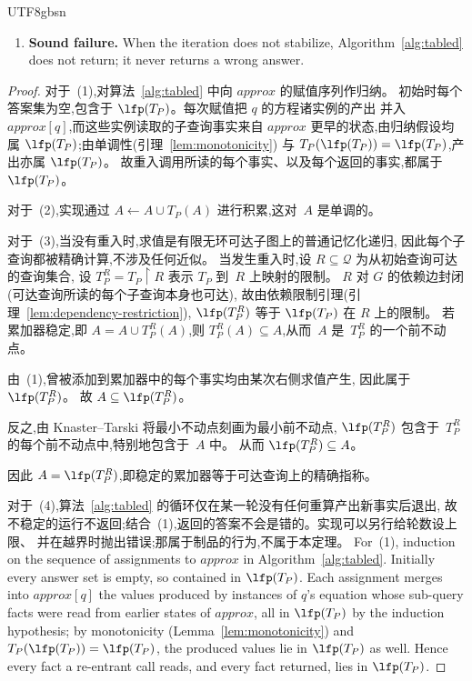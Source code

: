 \begin{CJK*}{UTF8}{gbsn}
\begin{theorem}
\begin{enumerate}
    \item \textbf{Sound failure.}
      When the iteration does not stabilize,
      Algorithm~\ref{alg:tabled} does not return; it never
      returns a wrong answer.
  \end{enumerate}
  \fi
\end{theorem}

\begin{proof}
\ifPaperChinese
  对于~(1),对算法~\ref{alg:tabled} 中向 $\mathit{approx}$ 的赋值序列作归纳。
  初始时每个答案集为空,包含于 $\lfp(T_P)$。每次赋值把 $q$ 的方程诸实例的产出
  并入 $\mathit{approx}[q]$,而这些实例读取的子查询事实来自 $\mathit{approx}$
  更早的状态,由归纳假设均属 $\lfp(T_P)$;由单调性(引理~\ref{lem:monotonicity})
  与 $T_P(\lfp(T_P)) = \lfp(T_P)$,产出亦属 $\lfp(T_P)$。
  故重入调用所读的每个事实、以及每个返回的事实,都属于 $\lfp(T_P)$。

  对于~(2),实现通过 $A \leftarrow A \cup T_P(A)$ 进行积累,这对~$A$ 是单调的。

  对于~(3),当没有重入时,求值是有限无环可达子图上的普通记忆化递归,
  因此每个子查询都被精确计算,不涉及任何近似。
  当发生重入时,设 $R \subseteq \mathcal{Q}$ 为从初始查询可达的查询集合,
  设 $T_P^R = T_P{\restriction}R$ 表示 $T_P$ 到~$R$ 上映射的限制。
  $R$ 对 $G$ 的依赖边封闭(可达查询所读的每个子查询本身也可达),
  故由依赖限制引理(引理~\ref{lem:dependency-restriction}),
  $\lfp(T_P^R)$ 等于 $\lfp(T_P)$ 在 $R$ 上的限制。
  若累加器稳定,即 $A = A \cup T_P^R(A)$,则
  $T_P^R(A) \subseteq A$,从而~$A$ 是~$T_P^R$ 的一个前不动点。

  由~(1),曾被添加到累加器中的每个事实均由某次右侧求值产生,
  因此属于 $\lfp(T_P^R)$。
  故 $A \subseteq \lfp(T_P^R)$。

  反之,由 Knaster--Tarski 将最小不动点刻画为最小前不动点,
  $\lfp(T_P^R)$ 包含于~$T_P^R$ 的每个前不动点中,特别地包含于~$A$ 中。
  从而 $\lfp(T_P^R) \subseteq A$。

  因此 $A = \lfp(T_P^R)$,即稳定的累加器等于可达查询上的精确指称。

  对于~(4),算法~\ref{alg:tabled} 的循环仅在某一轮没有任何重算产出新事实后退出,
  故不稳定的运行不返回;结合~(1),返回的答案不会是错的。实现可以另行给轮数设上限、
  并在越界时抛出错误;那属于制品的行为,不属于本定理。
\else
  For~(1), induction on the sequence of assignments to
  $\mathit{approx}$ in Algorithm~\ref{alg:tabled}. Initially every
  answer set is empty, so contained in $\lfp(T_P)$. Each assignment
  merges into $\mathit{approx}[q]$ the values produced by instances
  of $q$'s equation whose sub-query facts were read from earlier
  states of $\mathit{approx}$, all in $\lfp(T_P)$ by the induction
  hypothesis; by monotonicity (Lemma~\ref{lem:monotonicity}) and
  $T_P(\lfp(T_P)) = \lfp(T_P)$, the produced values lie in
  $\lfp(T_P)$ as well. Hence every fact a re-entrant call reads, and
  every fact returned, lies in $\lfp(T_P)$.


\end{proof}
\end{CJK*}
